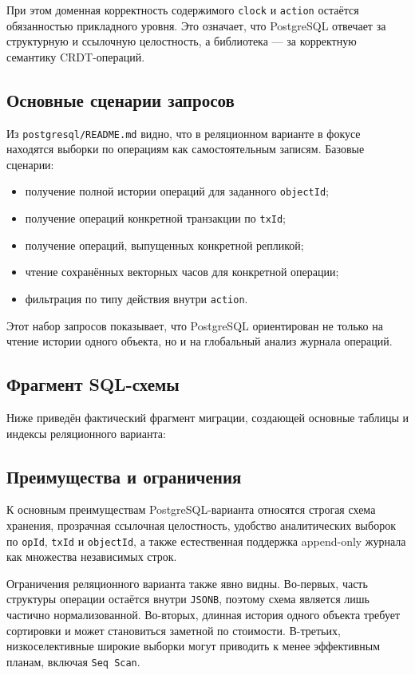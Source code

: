 \documentclass[a4paper,14pt]{extarticle}
\def\makefirstuc#1{#1}%
\def\normalsize{}%
\newcommand{\mysubsection}[1]{%
    \subsection{\normalsize\makefirstuc{#1}}
}
\newcommand{\codeexample}[3]{%
    
}
\begin{document}
При этом доменная корректность содержимого \texttt{clock} и \texttt{action}
остаётся обязанностью прикладного уровня. Это означает, что PostgreSQL отвечает
за структурную и ссылочную целостность, а библиотека --- за корректную семантику
CRDT-операций.

\mysubsection{Основные сценарии запросов}

Из \texttt{postgresql/README.md} видно, что в реляционном варианте в фокусе
находятся выборки по операциям как самостоятельным записям. Базовые сценарии:
\begin{itemize}[leftmargin=1.25cm]
    \item получение полной истории операций для заданного \texttt{objectId};
    \item получение операций конкретной транзакции по \texttt{txId};
    \item получение операций, выпущенных конкретной репликой;
    \item чтение сохранённых векторных часов для конкретной операции;
    \item фильтрация по типу действия внутри \texttt{action}.
\end{itemize}

Этот набор запросов показывает, что PostgreSQL ориентирован не только на чтение
истории одного объекта, но и на глобальный анализ журнала операций.

\mysubsection{Фрагмент SQL-схемы}

Ниже приведён фактический фрагмент миграции, создающей основные таблицы и индексы
реляционного варианта:

\codeexample{../postgresql/initdb/001_schema.sql}{SQL}{Миграция схемы PostgreSQL}

\mysubsection{Преимущества и ограничения}

К основным преимуществам PostgreSQL-варианта относятся строгая схема хранения,
прозрачная ссылочная целостность, удобство аналитических выборок по
\texttt{opId}, \texttt{txId} и \texttt{objectId}, а также естественная поддержка
append-only журнала как множества независимых строк.

Ограничения реляционного варианта также явно видны. Во-первых, часть структуры
операции остаётся внутри \texttt{JSONB}, поэтому схема является лишь частично
нормализованной. Во-вторых, длинная история одного объекта требует сортировки
и может становиться заметной по стоимости. В-третьих, низкоселективные широкие
выборки могут приводить к менее эффективным планам, включая \texttt{Seq Scan}.
\end{document}
